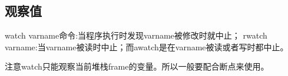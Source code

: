 \subsection{观察值}
watch varname命令:当程序执行时发现varname被修改时就中止；
rwatch varname:当varname被读时中止；而awatch是在varname被读或者写时都中止。

注意watch只能观察当前堆栈frame的变量。所以一般要配合断点来使用。







































